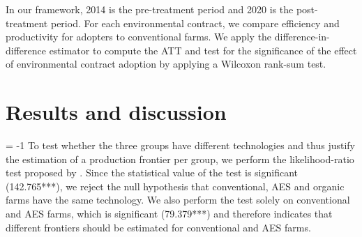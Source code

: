 \begin{Article}
\begin{refsection}[Lassalas]
In our framework, 2014 is the pre-treatment period and 2020 is the
post-\linebreak treatment period. For each environmental contract, we compare
efficiency and productivity for adopters to conventional farms. We apply
the difference-in-difference estimator to compute the ATT and test for
the significance of the effect of environmental contract adoption by
applying a Wilcoxon rank-sum test.

\section{Results and discussion}

\looseness = -1
To test whether the three groups have different technologies and thus
justify the estimation of a production frontier per group, we perform
the likelihood-ratio test proposed by \textcite{battese_rao_odonnell_2004}.
Since the statistical value of the test is significant (142.765***), we
reject the null hypothesis that conventional, AES and organic farms have
the same technology. We also perform the test solely on conventional and
AES farms, which is significant (79.379***) and therefore indicates that
different frontiers should be estimated for conventional and AES farms.


\end{refsection}
\end{Article}
